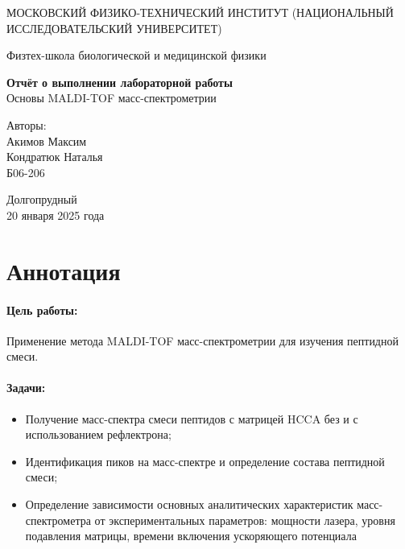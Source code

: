 \documentclass{article}
\begin{document}
\begin{titlepage}
	\begin{center}
		{\large МОСКОВСКИЙ ФИЗИКО-ТЕХНИЧЕСКИЙ ИНСТИТУТ (НАЦИОНАЛЬНЫЙ ИССЛЕДОВАТЕЛЬСКИЙ УНИВЕРСИТЕТ)}
	\end{center}
	\begin{center}
		{\large Физтех-школа биологической и медицинской физики}
	\end{center} 
	
	
	\vspace{4.5cm}
	{\huge
		\begin{center}
			{\bf Отчёт о выполнении лабораторной работы}\\
			Основы MALDI-TOF масс-спектрометрии
		\end{center}
	}
	\vspace{4.5cm}
	\begin{flushright}
		{\LARGE Авторы:\\ Акимов Максим \\ Кондратюк Наталья \\ 
			\vspace{0.5cm}
			Б06-206}
	\end{flushright}
	\vspace{4cm}
	\begin{center}
		Долгопрудный 
       \\20 января 2025 года
	\end{center}
 
\end{titlepage}

\newpage 
\section{Аннотация}
\paragraph*{Цель работы:}  Применение метода MALDI-TOF масс-спектрометрии для изучения пептидной смеси.
\paragraph*{Задачи:}
\begin{itemize}
    \item Получение масс-спектра смеси пептидов с матрицей HCCA без и с использованием рефлектрона;
    \item Идентификация пиков на масс-спектре и определение состава пептидной смеси;
    \item Определение зависимости основных аналитических характеристик масс-спектрометра от экспериментальных параметров: мощности лазера, уровня подавления матрицы, времени включения ускоряющего потенциала
\end{itemize}
\end{document}
